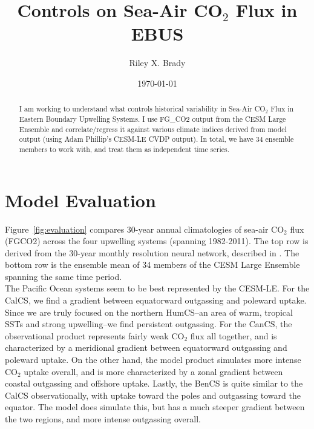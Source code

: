 \documentclass[12pt]{article}
\title{Controls on Sea-Air CO$_{2}$ Flux in EBUS}
\author{Riley X. Brady}
\date{\today}
\begin{document}
\maketitle
\begin{abstract}
\noindent I am working to understand what controls historical variability in Sea-Air CO$_{2}$ Flux in Eastern Boundary Upwelling Systems. I use FG\_CO2 output from the CESM Large Ensemble and correlate/regress it against various climate indices derived from model output (using Adam Phillip's CESM-LE CVDP output). In total, we have 34 ensemble members to work with, and treat them as independent time series.
\end{abstract}

\newpage
\section{Model Evaluation}
Figure~\ref{fig:evaluation} compares 30-year annual climatologies of sea-air CO$_{2}$ flux (FGCO2) across the four upwelling systems (spanning 1982-2011). The top row is derived from the 30-year monthly resolution neural network, described in \citet{Landschutzer2013}. The bottom row is the ensemble mean of 34 members of the CESM Large Ensemble spanning the same time period. \\

The Pacific Ocean systems seem to be best represented by the CESM-LE. For the CalCS, we find a gradient between equatorward outgassing and poleward uptake. Since we are truly focused on the northern HumCS--an area of warm, tropical SSTs and strong upwelling--we find persistent outgassing. For the CanCS, the observational product represents fairly weak CO$_{2}$ flux all together, and is characterized by a meridional gradient between equatorward outgassing and poleward uptake. On the other hand, the model product simulates more intense CO$_{2}$ uptake overall, and is more characterized by a zonal gradient between coastal outgassing and offshore uptake. Lastly, the BenCS is quite similar to the CalCS observationally, with uptake toward the poles and outgassing toward the equator. The model does simulate this, but has a much steeper gradient between the two regions, and more intense outgassing overall. \\
\end{document}
